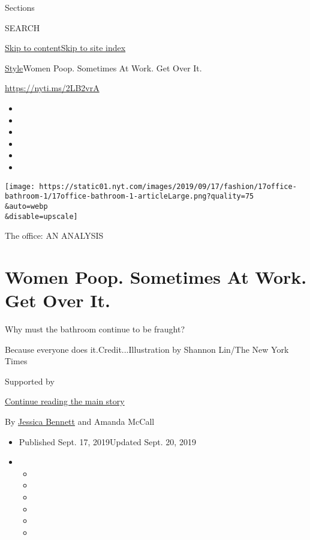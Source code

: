 Sections

SEARCH

\protect\hyperlink{site-content}{Skip to
content}\protect\hyperlink{site-index}{Skip to site index}

\href{/section/style}{Style}\textbar{}Women Poop. Sometimes At Work. Get
Over It.

\url{https://nyti.ms/2LB2vrA}

\begin{itemize}
\item
\item
\item
\item
\item
\item
\end{itemize}

\texttt{[image: https://static01.nyt.com/images/2019/09/17/fashion/17office-bathroom-1/17office-bathroom-1-articleLarge.png?quality=75\\\&auto=webp\\\&disable=upscale]}

The office: AN ANALYSIS

\hypertarget{women-poop-sometimes-at-work-get-over-it}{%
\section{Women Poop. Sometimes At Work. Get Over
It.}\label{women-poop-sometimes-at-work-get-over-it}}

Why must the bathroom continue to be fraught?

Because everyone does it.Credit...Illustration by Shannon Lin/The New
York Times

Supported by

\protect\hyperlink{after-sponsor}{Continue reading the main story}

By \href{https://www.nytimes.com/by/jessica-bennett}{Jessica Bennett}
and Amanda McCall

\begin{itemize}
\item
  Published Sept. 17, 2019Updated Sept. 20, 2019
\item
  \begin{itemize}
  \item
  \item
  \item
  \item
  \item
  \item
  \end{itemize}
\end{itemize}

